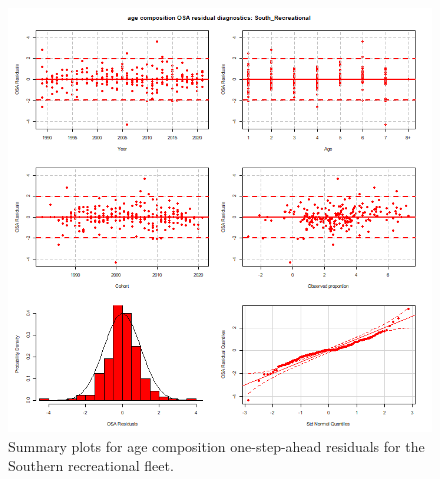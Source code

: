 \documentclass[
]{article}
\begin{document}
\begin{figure}

{\centering \includegraphics[width=1\linewidth]{../2023.RT.Runs/Run34/plots_png/diagnostics/OSA_resid_paa_6panel_South_Recreational} 

}

\caption{Summary plots for age composition one-step-ahead residuals for the Southern recreational fleet.}\label{fig:osa-South-rec-paa-summ}
\end{figure}
\end{document}
